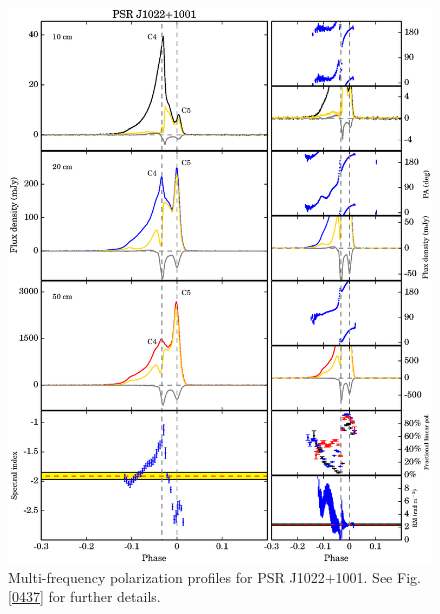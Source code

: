 \documentclass[useAMS,usenatbib]{mn2e}
\begin{document}
\begin{appendix}
\begin{figure}
\begin{center}
\includegraphics[width=6 in]{1022.ps}
\caption{Multi-frequency polarization profiles for PSR J1022$+$1001. 
See Fig. \ref{0437} for further details.}
\label{1022}
\end{center}
\end{figure}


\end{appendix}
\end{document}
